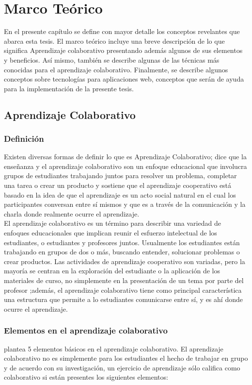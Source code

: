 \chapter{Marco Teórico}
\label{cap:marco_teorico}
En el presente capítulo se define con mayor detalle los conceptos revelantes que abarca esta tesis. El marco teórico incluye una breve descripción de lo que significa Aprendizaje colaborativo presentando además algunos de sus elementos y beneficios. Así mismo, también se describe algunas de las técnicas más conocidas para el aprendizaje colaborativo. Finalmente, se describe algunos conceptos sobre tecnologías para aplicaciones web, conceptos que serán de ayuda para la implementación de la presente tesis.
\section{Aprendizaje Colaborativo}
\subsection{Definición}
Existen diversas formas de definir lo que es Aprendizaje Colaborativo;  dice que la enseñanza y el aprendizaje colaborativo son un enfoque educacional que involucra grupos de estudiantes trabajando juntos para resolver un problema, completar una tarea o crear un producto y  sostiene que el aprendizaje cooperativo está basado en la idea de que el aprendizaje es un acto social natural en el cual los participantes conversan entre sí mismos y que es a través de la comunicación y la charla donde realmente ocurre el aprendizaje.\\

El aprendizaje colaborativo es un término para describir una variedad de enfoques educacionales que implican reunir el esfuerzo intelectual de los estudiantes, o estudiantes y profesores juntos. Usualmente los estudiantes están trabajando en grupos de dos o más, buscando entender, solucionar problemas o crear productos. Las actividades de aprendizaje cooperativo son variadas, pero la mayoría se centran en la exploración del estudiante o la aplicación de los materiales de curso, no simplemente en la presentación de un tema por parte del profesor \cite{smith_collaborative_1992};además, el aprendizaje colaborativo tiene como principal característica una estructura que permite a lo estudiantes comunicarse entre sí, y es ahí donde ocurre el aprendizaje\cite{golub1988focus}.

\subsection{Elementos en el aprendizaje colaborativo}
\cite{johnson_1984} plantea 5 elementos básicos en el aprendizaje colaborativo. El aprendizaje colaborativo no es simplemente para los estudiantes el hecho de trabajar en grupo y de acuerdo con su investigación,  un ejercicio de aprendizaje sólo califica como colaborativo si están presentes los siguientes elementos:

